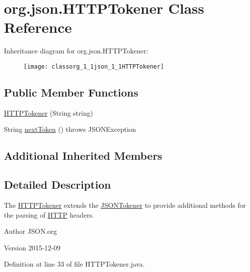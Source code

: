 \hypertarget{classorg_1_1json_1_1HTTPTokener}{\section{org.\-json.\-H\-T\-T\-P\-Tokener Class Reference}
\label{classorg_1_1json_1_1HTTPTokener}
}
Inheritance diagram for org.\-json.\-H\-T\-T\-P\-Tokener\-:\begin{figure}[H]
\begin{center}
\leavevmode
\texttt{[image: classorg\_1\_1json\_1\_1HTTPTokener]}
\end{center}
\end{figure}
\subsection*{Public Member Functions}
\begin{DoxyCompactItemize}
\item 
\hyperlink{classorg_1_1json_1_1HTTPTokener_a60475c4923ebf3ec28ed708bb0e4a6bc}{H\-T\-T\-P\-Tokener} (String string)
\item 
String \hyperlink{classorg_1_1json_1_1HTTPTokener_a7189a17298ad2e09dce28e52bd5ccd07}{next\-Token} ()  throws J\-S\-O\-N\-Exception 
\end{DoxyCompactItemize}
\subsection*{Additional Inherited Members}


\subsection{Detailed Description}
The \hyperlink{classorg_1_1json_1_1HTTPTokener}{H\-T\-T\-P\-Tokener} extends the \hyperlink{classorg_1_1json_1_1JSONTokener}{J\-S\-O\-N\-Tokener} to provide additional methods for the parsing of \hyperlink{classorg_1_1json_1_1HTTP}{H\-T\-T\-P} headers. \begin{DoxyAuthor}{Author}
J\-S\-O\-N.\-org 
\end{DoxyAuthor}
\begin{DoxyVersion}{Version}
2015-\/12-\/09 
\end{DoxyVersion}


Definition at line 33 of file H\-T\-T\-P\-Tokener.\-java.



